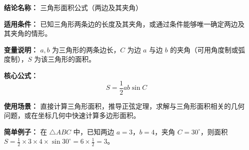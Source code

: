 \textbf{结论名称：} 三角形面积公式（两边及其夹角）

\textbf{适用条件：} 已知三角形两条边的长度及其夹角，或通过条件能够唯一确定两边及其夹角的情形。

\textbf{变量说明：} $a,b$ 为三角形的两条边长，$C$ 为边 $a$ 与边 $b$ 的夹角（可用角度制或弧度制），$S$ 为该三角形的面积。

\textbf{核心公式：}
\[
\boxed{S = \frac{1}{2}ab\sin C}
\]

\textbf{使用场景：} 直接计算三角形面积，推导正弦定理，求解与三角形面积相关的几何问题，或在坐标几何中快速计算多边形面积。

\textbf{简单例子：} 在 $\triangle ABC$ 中，已知两边 $a=3$，$b=4$，夹角 $C=30^\circ$，则面积 $S = \frac{1}{2} \times 3 \times 4 \times \sin 30^\circ = 6 \times \frac{1}{2} = 3$。